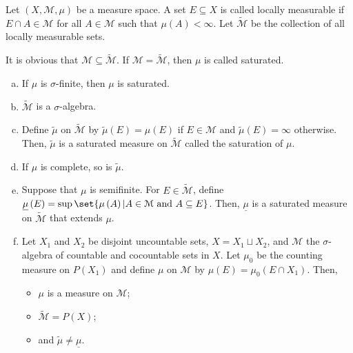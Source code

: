 \documentclass[10pt]{mypackage}
\begin{document}
\begin{exercise}
  Let $\left(X,\mathcal{M},\mu\right)$ be a measure space. A set $E\subseteq X$ is called locally measurable if $E\cap A \in \mathcal{M}$ for all $A\in \mathcal{M}$ such that $\mu\left(A\right) < \infty$. Let $\widetilde{\mathcal{M}}$ be the collection of all locally measurable sets.\newline

  It is obvious that $\mathcal{M}\subseteq \widetilde{\mathcal{M}}$. If $\mathcal{M} = \widetilde{\mathcal{M}}$, then $\mu$ is called saturated.
  \begin{enumerate}[(a)]
    \item If $\mu$ is $\sigma$-finite, then $\mu$ is saturated.
    \item $\widetilde{\mathcal{M}}$ is a $\sigma$-algebra.
    \item Define $\widetilde{\mu}$ on $\widetilde{\mathcal{M}}$ by $ \widetilde{\mu}\left(E\right) = \mu\left(E\right) $ if $E\in \mathcal{M}$ and $ \widetilde{\mu}\left(E\right) = \infty $ otherwise. Then, $\widetilde{\mu}$ is a saturated measure on $\widetilde{\mathcal{M}}$ called the saturation of $\mu$.
    \item If $\mu$ is complete, so is $\widetilde{\mu}$.
    \item Suppose that $\mu$ is semifinite. For $E\in \widetilde{\mathcal{M}}$, define $\underline{\mu}\left(E\right) = \sup\set{\mu\left(A\right) | A\in \mathcal{M}\text{ and }A\subseteq E}$. Then, $\underline{\mu}$ is a saturated measure on $\widetilde{\mathcal{M}}$ that extends $\mu$.
    \item Let $X_1$ and $X_2$ be disjoint uncountable sets, $X = X_1\sqcup X_2$, and $\mathcal{M}$ the $\sigma$-algebra of countable and cocountable sets in $X$. Let $\mu_0$ be the counting measure on $P\left(X_1\right)$ and define $\mu$ on $\mathcal{M}$ by $\mu\left(E\right) = \mu_0\left(E\cap X_1\right)$. Then, 
      \begin{itemize}
        \item $\mu$ is a measure on $\mathcal{M}$;
        \item $\widetilde{\mathcal{M}} = P(X)$;
        \item and $\widetilde{\mu}\neq \underline{\mu}$.
      \end{itemize}
  \end{enumerate}
\end{exercise}
\end{document}
